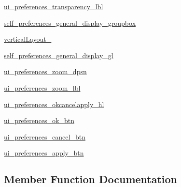 \begin{DoxyCompactItemize}
\item 
\hyperlink{classsettings_1_1preferences_u_i_1_1_ui___preferences_dialog_a243905c4e84872947db1bb8dcedadda4}{ui\+\_\+preferences\+\_\+transparency\+\_\+lbl}
\item 
\hyperlink{classsettings_1_1preferences_u_i_1_1_ui___preferences_dialog_a24dafe3bdccfb5c2439cca09d041f8e2}{self\+\_\+preferences\+\_\+general\+\_\+display\+\_\+groupbox}
\item 
\hyperlink{classsettings_1_1preferences_u_i_1_1_ui___preferences_dialog_a770a35129466bdc08cfc70c1a31d74d0}{vertical\+Layout\+\_}
\item 
\hyperlink{classsettings_1_1preferences_u_i_1_1_ui___preferences_dialog_a34e66b85aedb9d531bd13e099c4abd17}{self\+\_\+preferences\+\_\+general\+\_\+display\+\_\+gl}
\item 
\hyperlink{classsettings_1_1preferences_u_i_1_1_ui___preferences_dialog_ab9f4bd205de45a28fb6df5fd10a11e13}{ui\+\_\+preferences\+\_\+zoom\+\_\+dpsn}
\item 
\hyperlink{classsettings_1_1preferences_u_i_1_1_ui___preferences_dialog_a8321ca1cf385acdcd4a23a9aeba71982}{ui\+\_\+preferences\+\_\+zoom\+\_\+lbl}
\item 
\hyperlink{classsettings_1_1preferences_u_i_1_1_ui___preferences_dialog_abeeea5dce817fab1714dcfea02931865}{ui\+\_\+preferences\+\_\+okcancelapply\+\_\+hl}
\item 
\hyperlink{classsettings_1_1preferences_u_i_1_1_ui___preferences_dialog_a191d2ad10ffb160b79b7795e05fe37e3}{ui\+\_\+preferences\+\_\+ok\+\_\+btn}
\item 
\hyperlink{classsettings_1_1preferences_u_i_1_1_ui___preferences_dialog_a47ad79d67a89e77f0cf358171fac15b2}{ui\+\_\+preferences\+\_\+cancel\+\_\+btn}
\item 
\hyperlink{classsettings_1_1preferences_u_i_1_1_ui___preferences_dialog_a3f0de42b6f49c050f03b806cfc7541f7}{ui\+\_\+preferences\+\_\+apply\+\_\+btn}
\end{DoxyCompactItemize}


\subsection{Member Function Documentation}
\hypertarget{classsettings_1_1preferences_u_i_1_1_ui___preferences_dialog_a29096d3ca31a6d880f3e4680987243e8}{}\label{classsettings_1_1preferences_u_i_1_1_ui___preferences_dialog_a29096d3ca31a6d880f3e4680987243e8} 
